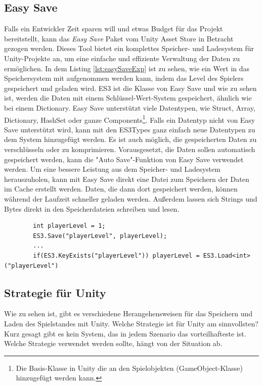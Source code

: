 \subsection{Easy Save}
Falls ein Entwickler Zeit sparen will und etwas Budget für das Projekt bereitstellt, kann das \textit{Easy Save} Paket vom Unity Asset Store in Betracht gezogen werden. Dieses Tool bietet ein komplettes Speicher- und Ladesystem für Unity-Projekte an, um eine einfache und effiziente Verwaltung der Daten zu ermöglichen.\cite{unityEasySave} In dem Listing \ref{lst:easySaveExp} ist zu sehen, wie ein Wert in das Speichersystem mit aufgenommen werden kann, indem das Level des Spielers gespeichert und geladen wird. ES3 ist die Klasse von Easy Save und wie zu sehen ist, werden die Daten mit einem Schlüssel-Wert-System gespeichert, ähnlich wie bei einem Dictionary.\cite{moodkieGettingStarted} Easy Save unterstützt viele Datentypen, wie Struct, Array, Dictionary, HashSet oder ganze Components\footnote{Die Basis-Klasse in Unity die an den Spielobjekten (GameObject-Klasse) hinzugefügt werden kann.\cite{unityComponent}}.\cite{moodkieSupportedTypes} Falls ein Datentyp nicht von Easy Save unterstützt wird, kann mit den ES3Types ganz einfach neue Datentypen zu dem System hinzugefügt werden.\cite{moodkieChoosingWhat} Es ist auch möglich, die gespeicherten Daten zu verschlüsseln oder zu komprimieren.\cite{moodkieGettingStarted} Vorausgesetzt, die Daten sollen automatisch gespeichert werden, kann die "Auto Save"-Funktion von Easy Save verwendet werden.\cite{moodkieAutoSave} Um eine bessere Leistung aus dem Speicher- und Ladesystem herauszuholen, kann mit Easy Save direkt eine Datei zum Speichern der Daten im Cache erstellt werden. Daten, die dann dort gespeichert werden, können während der Laufzeit schneller geladen werden.\cite{moodkieImprovingPerformance} Außerdem lassen sich Strings und Bytes direkt in den Speicherdateien schreiben und lesen.\cite{moodkieSavingLoading} 

\begin{listing}[htp]
    \begin{verbatim} 
        int playerLevel = 1;
        ES3.Save("playerLevel", playerLevel);
        ... 
        if(ES3.KeyExists("playerLevel")) playerLevel = ES3.Load<int>("playerLevel")
    \end{verbatim}
    \caption{Speichern und Laden eines Integers mit Easy Save}
    \label{lst:easySaveExp}
\end{listing}



\subsection{Strategie für Unity}
Wie zu sehen ist, gibt es verschiedene Herangehensweisen für das Speichern und Laden des Spielstandes mit Unity. Welche Strategie ist für Unity am sinnvollsten? Kurz gesagt gibt es kein System, das in jedem Szenario das vorteilhafteste ist. Welche Strategie verwendet werden sollte, hängt von der Situation ab. 

